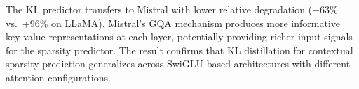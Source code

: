 The KL predictor transfers to Mistral with lower relative degradation (+63\% vs.\ +96\% on LLaMA). %
Mistral's GQA mechanism produces more informative key-value representations at each layer, potentially providing richer input signals for the sparsity predictor.
The result confirms that KL distillation for contextual sparsity prediction generalizes across SwiGLU-based architectures with different attention configurations.
